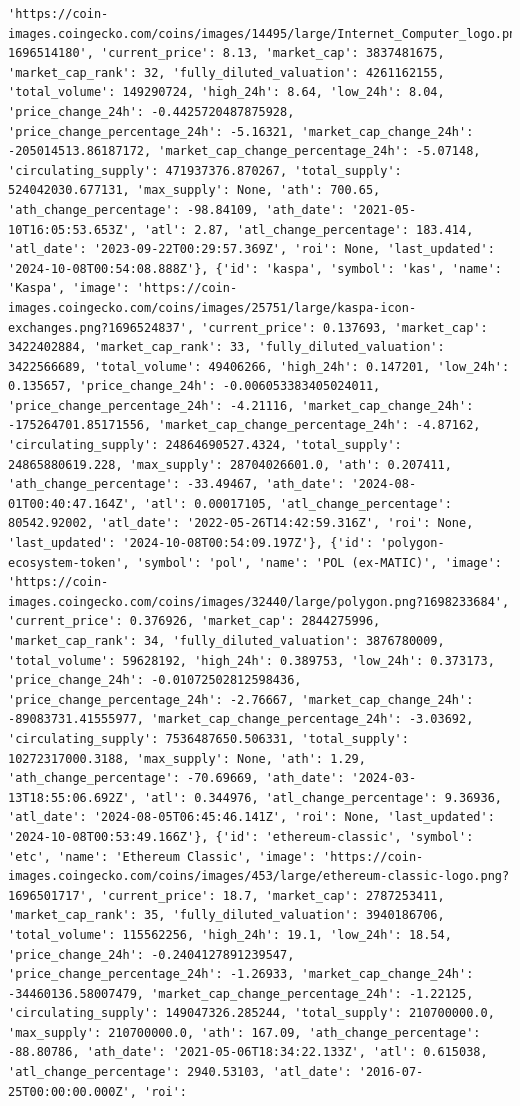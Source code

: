 \documentclass[
  letterpaper,
  DIV=11,
  numbers=noendperiod]{scrreprt}
\begin{document}
\begin{verbatim}
'https://coin-images.coingecko.com/coins/images/14495/large/Internet_Computer_logo.png?1696514180', 'current_price': 8.13, 'market_cap': 3837481675, 'market_cap_rank': 32, 'fully_diluted_valuation': 4261162155, 'total_volume': 149290724, 'high_24h': 8.64, 'low_24h': 8.04, 'price_change_24h': -0.4425720487875928, 'price_change_percentage_24h': -5.16321, 'market_cap_change_24h': -205014513.86187172, 'market_cap_change_percentage_24h': -5.07148, 'circulating_supply': 471937376.870267, 'total_supply': 524042030.677131, 'max_supply': None, 'ath': 700.65, 'ath_change_percentage': -98.84109, 'ath_date': '2021-05-10T16:05:53.653Z', 'atl': 2.87, 'atl_change_percentage': 183.414, 'atl_date': '2023-09-22T00:29:57.369Z', 'roi': None, 'last_updated': '2024-10-08T00:54:08.888Z'}, {'id': 'kaspa', 'symbol': 'kas', 'name': 'Kaspa', 'image': 'https://coin-images.coingecko.com/coins/images/25751/large/kaspa-icon-exchanges.png?1696524837', 'current_price': 0.137693, 'market_cap': 3422402884, 'market_cap_rank': 33, 'fully_diluted_valuation': 3422566689, 'total_volume': 49406266, 'high_24h': 0.147201, 'low_24h': 0.135657, 'price_change_24h': -0.006053383405024011, 'price_change_percentage_24h': -4.21116, 'market_cap_change_24h': -175264701.85171556, 'market_cap_change_percentage_24h': -4.87162, 'circulating_supply': 24864690527.4324, 'total_supply': 24865880619.228, 'max_supply': 28704026601.0, 'ath': 0.207411, 'ath_change_percentage': -33.49467, 'ath_date': '2024-08-01T00:40:47.164Z', 'atl': 0.00017105, 'atl_change_percentage': 80542.92002, 'atl_date': '2022-05-26T14:42:59.316Z', 'roi': None, 'last_updated': '2024-10-08T00:54:09.197Z'}, {'id': 'polygon-ecosystem-token', 'symbol': 'pol', 'name': 'POL (ex-MATIC)', 'image': 'https://coin-images.coingecko.com/coins/images/32440/large/polygon.png?1698233684', 'current_price': 0.376926, 'market_cap': 2844275996, 'market_cap_rank': 34, 'fully_diluted_valuation': 3876780009, 'total_volume': 59628192, 'high_24h': 0.389753, 'low_24h': 0.373173, 'price_change_24h': -0.01072502812598436, 'price_change_percentage_24h': -2.76667, 'market_cap_change_24h': -89083731.41555977, 'market_cap_change_percentage_24h': -3.03692, 'circulating_supply': 7536487650.506331, 'total_supply': 10272317000.3188, 'max_supply': None, 'ath': 1.29, 'ath_change_percentage': -70.69669, 'ath_date': '2024-03-13T18:55:06.692Z', 'atl': 0.344976, 'atl_change_percentage': 9.36936, 'atl_date': '2024-08-05T06:45:46.141Z', 'roi': None, 'last_updated': '2024-10-08T00:53:49.166Z'}, {'id': 'ethereum-classic', 'symbol': 'etc', 'name': 'Ethereum Classic', 'image': 'https://coin-images.coingecko.com/coins/images/453/large/ethereum-classic-logo.png?1696501717', 'current_price': 18.7, 'market_cap': 2787253411, 'market_cap_rank': 35, 'fully_diluted_valuation': 3940186706, 'total_volume': 115562256, 'high_24h': 19.1, 'low_24h': 18.54, 'price_change_24h': -0.2404127891239547, 'price_change_percentage_24h': -1.26933, 'market_cap_change_24h': -34460136.58007479, 'market_cap_change_percentage_24h': -1.22125, 'circulating_supply': 149047326.285244, 'total_supply': 210700000.0, 'max_supply': 210700000.0, 'ath': 167.09, 'ath_change_percentage': -88.80786, 'ath_date': '2021-05-06T18:34:22.133Z', 'atl': 0.615038, 'atl_change_percentage': 2940.53103, 'atl_date': '2016-07-25T00:00:00.000Z', 'roi': 
\end{verbatim}
\end{document}
